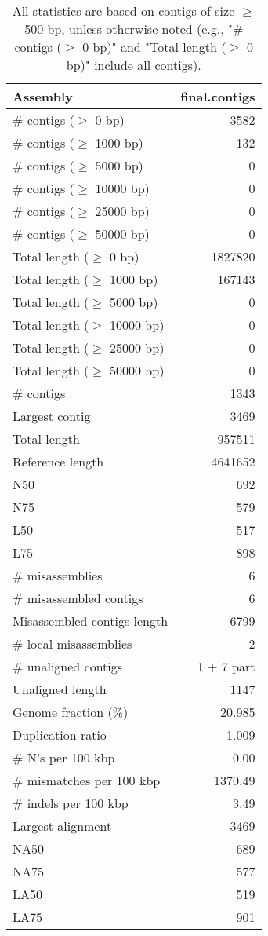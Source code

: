 \documentclass[12pt,a4paper]{article}
\begin{document}
\begin{table}[ht]
\begin{center}
\caption{All statistics are based on contigs of size $\geq$ 500 bp, unless otherwise noted (e.g., "\# contigs ($\geq$ 0 bp)" and "Total length ($\geq$ 0 bp)" include all contigs).}
\begin{tabular}{|l*{1}{|r}|}
\hline
Assembly & final.contigs \\ \hline
\# contigs ($\geq$ 0 bp) & 3582 \\ \hline
\# contigs ($\geq$ 1000 bp) & 132 \\ \hline
\# contigs ($\geq$ 5000 bp) & 0 \\ \hline
\# contigs ($\geq$ 10000 bp) & 0 \\ \hline
\# contigs ($\geq$ 25000 bp) & 0 \\ \hline
\# contigs ($\geq$ 50000 bp) & 0 \\ \hline
Total length ($\geq$ 0 bp) & 1827820 \\ \hline
Total length ($\geq$ 1000 bp) & 167143 \\ \hline
Total length ($\geq$ 5000 bp) & 0 \\ \hline
Total length ($\geq$ 10000 bp) & 0 \\ \hline
Total length ($\geq$ 25000 bp) & 0 \\ \hline
Total length ($\geq$ 50000 bp) & 0 \\ \hline
\# contigs & 1343 \\ \hline
Largest contig & 3469 \\ \hline
Total length & 957511 \\ \hline
Reference length & 4641652 \\ \hline
N50 & 692 \\ \hline
N75 & 579 \\ \hline
L50 & 517 \\ \hline
L75 & 898 \\ \hline
\# misassemblies & 6 \\ \hline
\# misassembled contigs & 6 \\ \hline
Misassembled contigs length & 6799 \\ \hline
\# local misassemblies & 2 \\ \hline
\# unaligned contigs & 1 + 7 part \\ \hline
Unaligned length & 1147 \\ \hline
Genome fraction (\%) & 20.985 \\ \hline
Duplication ratio & 1.009 \\ \hline
\# N's per 100 kbp & 0.00 \\ \hline
\# mismatches per 100 kbp & 1370.49 \\ \hline
\# indels per 100 kbp & 3.49 \\ \hline
Largest alignment & 3469 \\ \hline
NA50 & 689 \\ \hline
NA75 & 577 \\ \hline
LA50 & 519 \\ \hline
LA75 & 901 \\ \hline
\end{tabular}
\end{center}
\end{table}
\end{document}
